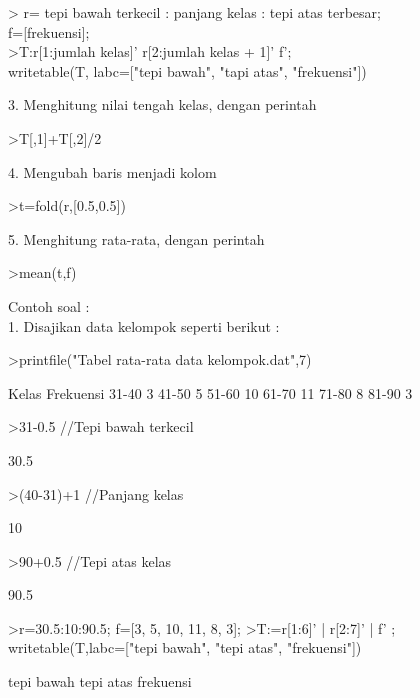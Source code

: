 \documentclass[a4paper,10pt]{article}
\begin{document}
\begin{eulernotebook}
\begin{eulercomment}
\begin{eulercomment}
\begin{eulercomment}
\begin{eulercomment}
\begin{eulercomment}
\begin{eulercomment}
\begin{eulercomment}
\begin{eulercomment}
\begin{eulercomment}
\begin{eulercomment}
\begin{eulercomment}
\begin{eulercomment}
\begin{eulercomment}
\textgreater{} r= tepi bawah terkecil : panjang kelas : tepi atas terbesar;\\
f=[frekuensi];\\
\textgreater{}T:r[1:jumlah kelas]' \textbar{} r[2:jumlah kelas + 1]' \textbar{}f';\\
writetable(T, labc=["tepi bawah", "tapi atas", "frekuensi"])

3. Menghitung nilai tengah kelas, dengan perintah

\textgreater{}T[,1]+T[,2]/2

4. Mengubah baris menjadi kolom

\textgreater{}t=fold(r,[0.5,0.5])

5. Menghitung rata-rata, dengan perintah

\textgreater{}mean(t,f)

Contoh soal :\\
1. Disajikan data kelompok seperti berikut :
\end{eulercomment}
\begin{eulerprompt}
>printfile("Tabel rata-rata data kelompok.dat",7)
\end{eulerprompt}
\begin{euleroutput}
        Kelas     Frekuensi
        31-40         3
        41-50         5
        51-60         10
        61-70         11
        71-80         8
        81-90         3
\end{euleroutput}
\begin{eulerprompt}
>31-0.5  //Tepi bawah terkecil
\end{eulerprompt}
\begin{euleroutput}
  30.5
\end{euleroutput}
\begin{eulerprompt}
>(40-31)+1  //Panjang kelas
\end{eulerprompt}
\begin{euleroutput}
  10
\end{euleroutput}
\begin{eulerprompt}
>90+0.5 //Tepi atas kelas
\end{eulerprompt}
\begin{euleroutput}
  90.5
\end{euleroutput}
\begin{eulerprompt}
>r=30.5:10:90.5; f=[3, 5, 10, 11, 8, 3];
>T:=r[1:6]' | r[2:7]' | f' ; writetable(T,labc=["tepi bawah", "tepi atas", "frekuensi"])
\end{eulerprompt}
\begin{euleroutput}
   tepi bawah tepi atas frekuensi

\end{euleroutput}
\end{eulercomment}
\end{eulercomment}
\end{eulercomment}
\end{eulercomment}
\end{eulercomment}
\end{eulercomment}
\end{eulercomment}
\end{eulercomment}
\end{eulercomment}
\end{eulercomment}
\end{eulercomment}
\end{eulercomment}
\end{eulernotebook}
\end{document}
